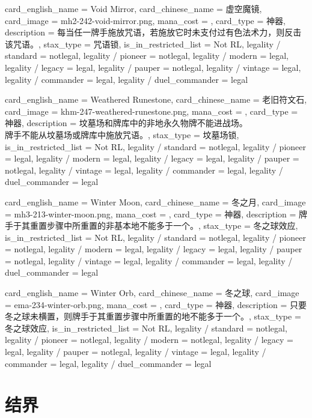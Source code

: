 \documentclass[lang = cn, color = black, 10pt]{AllThatStax}
\begin{document}
\card
{
	card_english_name = {Void Mirror},
	card_chinese_name = {虚空魔镜},
	card_image = mh2-242-void-mirror.png,
	mana_cost = ,
	card_type = 神器,
	description = {每当任一牌手施放咒语，若施放它时未支付过有色法术力，则反击该咒语。},
	stax_type = 咒语锁,
	is_in_restricted_list = Not RL,
	legality / standard = notlegal,
	legality / pioneer = notlegal,
	legality / modern = legal,
	legality / legacy = legal,
	legality / pauper = notlegal,
	legality / vintage = legal,
	legality / commander = legal,
	legality / duel_commander = legal
}

\card
{
	card_english_name = {Weathered Runestone},
	card_chinese_name = {老旧符文石},
	card_image = khm-247-weathered-runestone.png,
	mana_cost = ,
	card_type = 神器,
	description = {坟墓场和牌库中的非地永久物牌不能进战场。\\
牌手不能从坟墓场或牌库中施放咒语。},
	stax_type = 坟墓场锁,
	is_in_restricted_list = Not RL,
	legality / standard = notlegal,
	legality / pioneer = legal,
	legality / modern = legal,
	legality / legacy = legal,
	legality / pauper = notlegal,
	legality / vintage = legal,
	legality / commander = legal,
	legality / duel_commander = legal
}

\card
{
	card_english_name = {Winter Moon},
	card_chinese_name = {冬之月},
	card_image = mh3-213-winter-moon.png,
	mana_cost = ,
	card_type = 神器,
	description = {牌手于其重置步骤中所重置的非基本地不能多于一个。},
	stax_type = 冬之球效应,
	is_in_restricted_list = Not RL,
	legality / standard = notlegal,
	legality / pioneer = notlegal,
	legality / modern = legal,
	legality / legacy = legal,
	legality / pauper = notlegal,
	legality / vintage = legal,
	legality / commander = legal,
	legality / duel_commander = legal
}

\card
{
	card_english_name = {Winter Orb},
	card_chinese_name = {冬之球},
	card_image = ema-234-winter-orb.png,
	mana_cost = ,
	card_type = 神器,
	description = {只要冬之球未横置，则牌手于其重置步骤中所重置的地不能多于一个。},
	stax_type = 冬之球效应,
	is_in_restricted_list = Not RL,
	legality / standard = notlegal,
	legality / pioneer = notlegal,
	legality / modern = notlegal,
	legality / legacy = legal,
	legality / pauper = notlegal,
	legality / vintage = legal,
	legality / commander = legal,
	legality / duel_commander = legal
}

\section{结界}
\end{document}
